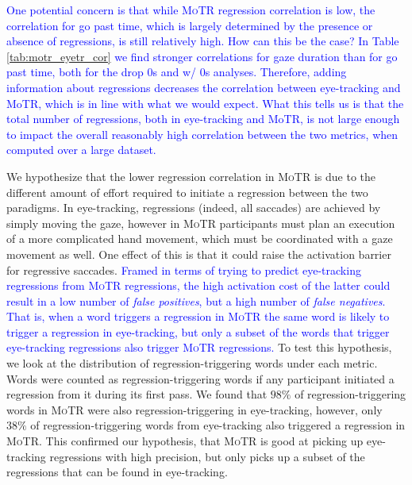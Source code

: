 \documentclass[12pt]{article}
\newcommand{\motr}{\textsc{MoTR}\xspace}
\newcommand{\change}[1]{\textcolor{blue}{#1}}
\begin{document}
{\change{One potential concern is that while \motr regression correlation is low, the correlation for go past time, which is largely determined by the presence or absence of regressions, is still relatively high. How can this be the case? In Table \ref{tab:motr_eyetr_cor} we find stronger correlations for gaze duration than for go past time, both for the drop 0s and w/ 0s analyses. Therefore, adding information about regressions decreases the correlation between eye-tracking and MoTR, which is in line with what we would expect. What this tells us is that the total number of regressions, both in eye-tracking and MoTR, is not large enough to impact the overall reasonably high correlation between the two metrics, when computed over a large dataset.}

We hypothesize that the lower regression correlation in \motr is due to the different amount of effort required to initiate a regression between the two paradigms. In eye-tracking, regressions (indeed, all saccades) are achieved by simply moving the gaze, however in \motr participants must plan an execution of a more complicated hand movement, which must be coordinated with a gaze movement as well. One effect of this is that it could raise the activation barrier for regressive saccades. \change{Framed in terms of trying to predict eye-tracking regressions from \motr regressions, the high activation cost of the latter could result in a low number of \emph{false positives}, but a high number of \emph{false negatives}. That is, when a word triggers a regression in \motr the same word is likely to trigger a regression in eye-tracking, but only a subset of the words that trigger eye-tracking regressions also trigger \motr regressions.} To test this hypothesis, we look at the distribution of regression-triggering words under each metric. Words were counted as regression-triggering words if any participant initiated a regression from it during its first pass. We found that $98\%$ of regression-triggering words in \motr were also regression-triggering in eye-tracking, however, only $38\%$ of regression-triggering words from eye-tracking also triggered a regression in \motr. This confirmed our hypothesis, that \motr is good at picking up eye-tracking regressions with high precision, but only picks up a subset of the regressions that can be found in eye-tracking.


}
\end{document}
